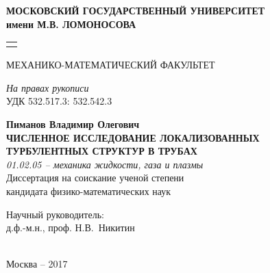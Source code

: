 \begin{titlepage}
\newpage


\begin{center}
{\bf МОСКОВСКИЙ ГОСУДАРСТВЕННЫЙ УНИВЕРСИТЕТ} \\[3pt]
{\bf имени М.В. ЛОМОНОСОВА} \\[3pt]
\begin{tabular}{p{\textwidth}}
\hline {} \\[-14pt]
\end{tabular}
МЕХАНИКО-МАТЕМАТИЧЕСКИЙ ФАКУЛЬТЕТ \\[40pt]
\end{center}

\begin{flushright}
{\it На правах рукописи}\\
УДК 532.517.3: 532.542.3\\[50pt]
\end{flushright}

\begin{center}
{\bf Пиманов Владимир Олегович} \\[30pt]
{\bf ЧИСЛЕННОЕ ИССЛЕДОВАНИЕ ЛОКАЛИЗОВАННЫХ} \\ 
{\bf ТУРБУЛЕНТНЫХ СТРУКТУР В ТРУБАХ} \\[30pt]
{\it 01.02.05 -- механика жидкости, газа и плазмы} \\[30pt]
Диссертация на соискание ученой степени \\
кандидата физико-математических наук \\[30mm]
\hfill\parbox[t]{80mm}{Научный руководитель: \\ д.ф.-м.н., проф. Н.В.~Никитин} \\[5cm]
Москва -- 2017
\end{center}

\end{titlepage}
